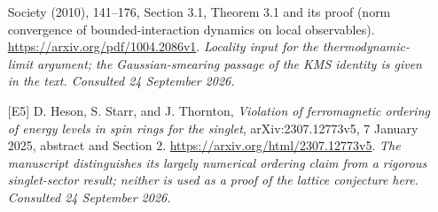 \documentclass[11pt]{article}
\begin{document}
\begin{itemize}
		Society (2010), 141--176, Section 3.1, Theorem 3.1 and its proof
		(norm convergence of bounded-interaction dynamics on local observables).
		\url{https://arxiv.org/pdf/1004.2086v1}.
		{\small\textit{Locality input for the thermodynamic-limit argument;
				the Gaussian-smearing passage of the KMS identity is given in the text.
				Consulted 24 September 2026.}}
		\item[\textnormal{[E5]}]\hypertarget{extra:30006979:5}{}
		D. Heson, S. Starr, and J. Thornton, \emph{Violation of ferromagnetic
			ordering of energy levels in spin rings for the singlet},
		arXiv:2307.12773v5, 7 January 2025, abstract and Section 2.
		\url{https://arxiv.org/html/2307.12773v5}.
		{\small\textit{The manuscript distinguishes its largely numerical
				ordering claim from a rigorous singlet-sector result; neither is
				used as a proof of the lattice conjecture here. Consulted
				24 September 2026.}}
	\end{itemize}
\end{document}
